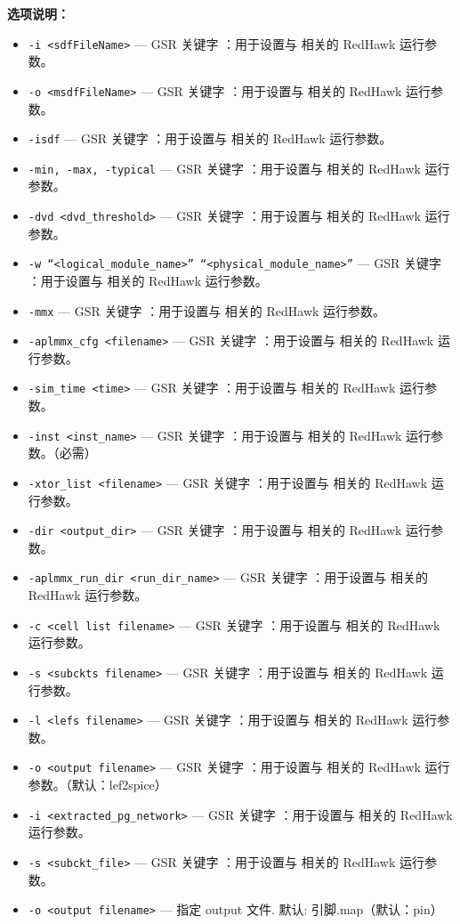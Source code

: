 \textbf{选项说明：}
\begin{itemize}
\item \texttt{-i <sdfFileName>} — GSR 关键字 ：用于设置与  相关的 RedHawk 运行参数。
\item \texttt{-o <msdfFileName>} — GSR 关键字 ：用于设置与  相关的 RedHawk 运行参数。
\item \texttt{-isdf} — GSR 关键字 ：用于设置与  相关的 RedHawk 运行参数。
\item \texttt{-min, -max, -typical} — GSR 关键字 ：用于设置与  相关的 RedHawk 运行参数。
\item \texttt{-dvd <dvd\_threshold>} — GSR 关键字 ：用于设置与  相关的 RedHawk 运行参数。
\item \texttt{-w “<logical\_module\_name>” “<physical\_module\_name>”} — GSR 关键字 ：用于设置与  相关的 RedHawk 运行参数。
\item \texttt{-mmx} — GSR 关键字 ：用于设置与  相关的 RedHawk 运行参数。
\item \texttt{-aplmmx\_cfg <filename>} — GSR 关键字 ：用于设置与  相关的 RedHawk 运行参数。
\item \texttt{-sim\_time <time>} — GSR 关键字 ：用于设置与  相关的 RedHawk 运行参数。
\item \texttt{-inst <inst\_name>} — GSR 关键字 ：用于设置与  相关的 RedHawk 运行参数。（必需）
\item \texttt{-xtor\_list <filename>} — GSR 关键字 ：用于设置与  相关的 RedHawk 运行参数。
\item \texttt{-dir <output\_dir>} — GSR 关键字 ：用于设置与  相关的 RedHawk 运行参数。
\item \texttt{-aplmmx\_run\_dir <run\_dir\_name>} — GSR 关键字 ：用于设置与  相关的 RedHawk 运行参数。
\item \texttt{-c <cell list filename>} — GSR 关键字 ：用于设置与  相关的 RedHawk 运行参数。
\item \texttt{-s <subckts filename>} — GSR 关键字 ：用于设置与  相关的 RedHawk 运行参数。
\item \texttt{-l <lefs filename>} — GSR 关键字 ：用于设置与  相关的 RedHawk 运行参数。
\item \texttt{-o <output filename>} — GSR 关键字 ：用于设置与  相关的 RedHawk 运行参数。（默认：lef2spice）
\item \texttt{-i <extracted\_pg\_network>} — GSR 关键字 ：用于设置与  相关的 RedHawk 运行参数。
\item \texttt{-s <subckt\_file>} — GSR 关键字 ：用于设置与  相关的 RedHawk 运行参数。
\item \texttt{-o <output filename>} — 指定 output 文件. 默认: 引脚.map（默认：pin）
\end{itemize}

